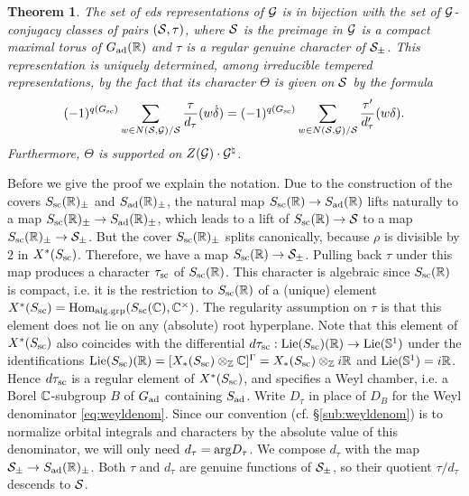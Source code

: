 \documentclass{article}
\newtheorem{thm}{Theorem}[subsection]
\theoremstyle{definition}
\numberwithin{equation}{section}
\renewcommand{\-}{\hyp{}}
\begin{document}
\begin{thm} \label{thm:eds}
The set of eds representations of $\mathcal{G}$ is in bijection with the set of $\mathcal{G}$-conjugacy classes of pairs $(\mathcal{S},\tau)$, where $\mathcal{S}$ is the preimage in $\mathcal{G}$ is a compact maximal torus of $G_{\textrm{ad}}(\mathbb{R})$ and $\tau$ is a regular genuine character of $\mathcal{S}_\pm$. This representation is uniquely determined, among irreducible tempered representations, by the fact that its character $\Theta$ is given on $\mathcal{S}$ by the formula
\begin{equation} \label{eq:charfmla}
		(-1)^{q(G_{\textrm{sc}})}\sum_{w \in N(\mathcal{S},\mathcal{G})/\mathcal{S}} \frac{\tau}{d_\tau}(w\dot\delta) = (-1)^{q(G_{\textrm{sc}})}\sum_{w \in N(\mathcal{S},\mathcal{G})/\mathcal{S}} \frac{\tau'}{d'_\tau}(w\delta).
\end{equation}
Furthermore, $\Theta$ is supported on $Z(\mathcal{G})\cdot \mathcal{G}^\natural$.
\end{thm}

Before we give the proof we explain the notation. Due to the construction of the covers $S_{\textrm{sc}}(\mathbb{R})_\pm$ and $S_{\textrm{ad}}(\mathbb{R})_\pm$, the natural map $S_{\textrm{sc}}(\mathbb{R}) \to S_{\textrm{ad}}(\mathbb{R})$ lifts naturally to a map $S_{\textrm{sc}}(\mathbb{R})_\pm \to S_{\textrm{ad}}(\mathbb{R})_\pm$, which leads to a lift of $S_{\textrm{sc}}(\mathbb{R}) \to \mathcal{S}$ to a map $S_{\textrm{sc}}(\mathbb{R})_\pm \to \mathcal{S}_\pm$. But the cover $S_{\textrm{sc}}(\mathbb{R})_\pm$ splits canonically, because $\rho$ is divisible by $2$ in $X^*(S_{\textrm{sc}})$. Therefore, we have a map $S_{\textrm{sc}}(\mathbb{R}) \to \mathcal{S}_\pm$. Pulling back $\tau$ under this map produces a character $\tau_{\textrm{sc}}$ of $S_{\textrm{sc}}(\mathbb{R})$. This character is algebraic since $S_{\textrm{sc}}(\mathbb{R})$ is compact, i.e. it is the restriction to $S_{\textrm{sc}}(\mathbb{R})$ of a (unique) element $X^*(S_{\textrm{sc}})=\textrm{Hom}_{\textrm{alg.grp}}(S_{\textrm{sc}}(\mathbb{C}),\mathbb{C}^\times)$. The regularity assumption on $\tau$ is that this element does not lie on any (absolute) root hyperplane. Note that this element of $X^*(S_{\textrm{sc}})$ also coincides with the differential $d\tau_{\textrm{sc}} : \textrm{Lie}(S_{\textrm{sc}})(\mathbb{R}) \to \textrm{Lie}(\mathbb{S}^1)$ under the identifications $\textrm{Lie}(S_{\textrm{sc}})(\mathbb{R})=[X_*(S_{\textrm{sc}}) \otimes_{\mathbb{Z}} \mathbb{C}]^\Gamma = X_*(S_{\textrm{sc}})\otimes_{\mathbb{Z}} i\mathbb{R}$ and $\textrm{Lie}(\mathbb{S}^1)=i\mathbb{R}$. Hence $d\tau_{\textrm{sc}}$ is a regular element of $X^*(S_{\textrm{sc}})$, and specifies a Weyl chamber, i.e. a Borel $\mathbb{C}$-subgroup $B$ of $G_{\textrm{ad}}$ containing $S_{\textrm{ad}}$. Write $D_\tau$ in place of $D_B$ for the Weyl denominator \eqref{eq:weyldenom}. Since our convention (cf. \S\ref{sub:weyldenom}) is to normalize orbital integrals and characters by the absolute value of this denominator, we will only need $d_\tau=\textrm{arg}D_\tau$. We compose $d_\tau$ with the map $\mathcal{S}_\pm \to S_{\textrm{ad}}(\mathbb{R})_\pm$. Both $\tau$ and $d_\tau$ are genuine functions of $\mathcal{S}_\pm$, so their quotient $\tau/d_\tau$ descends to $\mathcal{S}$.
\end{document}
